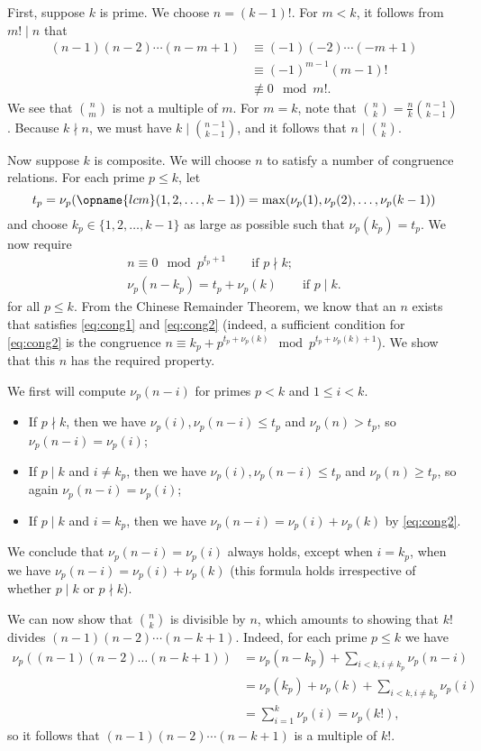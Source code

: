 \documentclass[11pt]{scrartcl}
\begin{document}
First,  suppose $k$ is prime.  We choose $n=(k-1)!$. For
$m<k$,  it follows from $m! \mid n$ that
\begin{align*}
  (n-1)(n-2) \dotsm (n-m+1) &\equiv (-1)(-2) \dotsm (-m+1) \\
  &\equiv (-1)^{m-1} (m-1)! \\
  &\not\equiv 0 \mod m!.
\end{align*}
We see that $\binom{n}{m}$ is not a multiple of $m$.  For $m=k$, note that
$\binom{n}{k} = \frac{n}{k} \binom{n-1}{k-1}$.  Because $k \nmid n$, we must
have $k \mid \binom{n-1}{k-1}$,  and it follows that $n \mid \binom{n}{k}$.

Now suppose $k$ is composite.
We will choose $n$ to satisfy a number of congruence relations.  For each prime $p \le k$,  let
\[t_p = \nu_p(\opname{lcm}(1,2,\dots,k-1)) = \max(\nu_p(1), \nu_p(2),\dots,\nu_p(k-1))\]
and choose $k_p \in \{1,2,\dots,k-1\}$ as large as possible such that $\nu_p(k_p)=t_p$.  We now require
\begin{align}
n \equiv 0 \mod p^{t_p+1} \qquad \mbox{if $p \nmid k$}; \label{eq:cong1}\\
\nu_p(n - k_p) = t_p+\nu_p(k) \qquad \mbox{if $p \mid k$}. \label{eq:cong2}
\end{align}
for all $p \le k$.  From the Chinese Remainder Theorem,  we know that an $n$ exists that satisfies \eqref{eq:cong1} and \eqref{eq:cong2} (indeed, a sufficient condition for \eqref{eq:cong2} is the congruence $n \equiv k_p + p^{t_p+\nu_p(k)} \mod p^{t_p+\nu_p(k)+1}$).  We show that this $n$ has the required property.

We first will compute $\nu_p(n-i)$ for primes $p<k$ and $1 \le i < k$.
\begin{itemize}
\item If $p \nmid k$, then we have $\nu_p(i), \nu_p(n-i) \le t_p$ and $\nu_p(n) > t_p$, so $\nu_p(n-i) = \nu_p(i)$;
\item If $p \mid k$ and $i \neq k_p$, then we have $\nu_p(i), \nu_p(n-i) \le t_p$ and $\nu_p(n) \ge t_p$, so again $\nu_p(n-i) = \nu_p(i)$;
\item If $p \mid k$ and $i = k_p$, then we have $\nu_p(n-i) = \nu_p(i) + \nu_p(k)$ by \eqref{eq:cong2}.
\end{itemize}
We conclude that $\nu_p(n-i) = \nu_p(i)$ always holds, except when $i = k_p$, when we have $\nu_p(n-i) = \nu_p(i) + \nu_p(k)$ (this formula holds irrespective of whether $p \mid k$ or $p \nmid k$).

We can now show that $\binom{n}{k}$ is divisible by $n$,  which amounts to
showing that $k!$ divides $(n-1)(n-2) \dotsm (n-k+1)$.  Indeed,  for each prime $p \le k$ we have
\begin{align*}
\nu_p\left( (n-1)(n-2) \dots (n-k+1) \right) &=  \nu_p(n-k_p) + \sum_{i<k,  i \neq k_p} \nu_p(n-i) \\
&= \nu_p(k_p) + \nu_p(k) + \sum_{i<k, i \neq k_p} \nu_p(i) \\
&= \sum_{i=1}^k \nu_p(i) = \nu_p(k!),
\end{align*}
so it follows that $(n-1)(n-2) \dotsm (n-k+1)$ is a multiple of $k!$.
\end{document}
